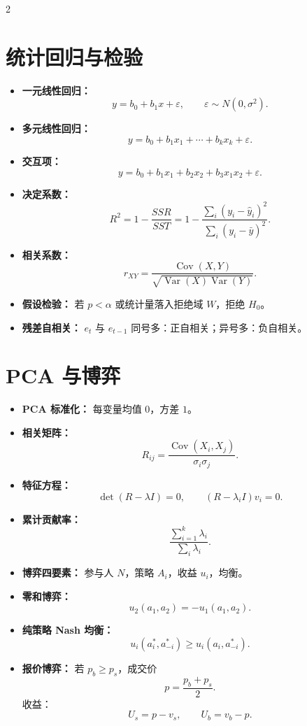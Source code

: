 \documentclass[UTF8,fontset=windows,10pt,a4paper]{ctexart}
\newcommand{\tagline}[1]{\textbf{\color{blue!60!black}#1：}}
\begin{document}
\begin{multicols}{2}
\section{统计回归与检验}
\begin{itemize}
  \item \tagline{一元线性回归}
  \[
    y=b_0+b_1x+\varepsilon,\qquad \varepsilon\sim N(0,\sigma^2).
  \]
  \item \tagline{多元线性回归}
  \[
    y=b_0+b_1x_1+\cdots+b_kx_k+\varepsilon.
  \]
  \item \tagline{交互项}
  \[
    y=b_0+b_1x_1+b_2x_2+b_3x_1x_2+\varepsilon.
  \]
  \item \tagline{决定系数}
  \[
    R^2=1-\frac{SSR}{SST}
    =1-\frac{\sum_i(y_i-\hat y_i)^2}{\sum_i(y_i-\bar y)^2}.
  \]
  \item \tagline{相关系数}
  \[
    r_{XY}=\frac{\operatorname{Cov}(X,Y)}
    {\sqrt{\operatorname{Var}(X)\operatorname{Var}(Y)}}.
  \]
  \item \tagline{假设检验} 若 $p<\alpha$ 或统计量落入拒绝域 $W$，拒绝 $H_0$。
  \item \tagline{残差自相关} $e_t$ 与 $e_{t-1}$ 同号多：正自相关；异号多：负自相关。
\end{itemize}

\section{PCA 与博弈}
\begin{itemize}
  \item \tagline{PCA 标准化} 每变量均值 $0$，方差 $1$。
  \item \tagline{相关矩阵}
  \[
    R_{ij}=\frac{\operatorname{Cov}(X_i,X_j)}{\sigma_i\sigma_j}.
  \]
  \item \tagline{特征方程}
  \[
    \det(R-\lambda I)=0,\qquad (R-\lambda_iI)v_i=0.
  \]
  \item \tagline{累计贡献率}
  \[
    \frac{\sum_{i=1}^k\lambda_i}{\sum_i\lambda_i}.
  \]
  \item \tagline{博弈四要素} 参与人 $N$，策略 $A_i$，收益 $u_i$，均衡。
  \item \tagline{零和博弈}
  \[
    u_2(a_1,a_2)=-u_1(a_1,a_2).
  \]
  \item \tagline{纯策略 Nash 均衡}
  \[
    u_i(a_i^*,a_{-i}^*)\ge u_i(a_i,a_{-i}^*).
  \]
  \item \tagline{报价博弈}
  若 $p_b\ge p_s$，成交价
  \[
    p=\frac{p_b+p_s}{2}.
  \]
  收益：
  \[
    U_s=p-v_s,\qquad U_b=v_b-p.
  \]
\end{itemize}

\end{multicols}
\end{document}
